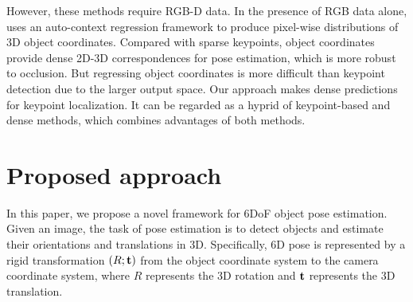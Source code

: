\documentclass[10pt,twocolumn,letterpaper]{article}
\begin{document}
However, these methods require RGB-D data. 
In the presence of RGB data alone, \cite{brachmann2016uncertainty} uses an auto-context regression framework \cite{tu2010auto} to produce pixel-wise distributions of 3D object coordinates. 
Compared with sparse keypoints, object coordinates provide dense 2D-3D correspondences for pose estimation, which is more robust to occlusion. But regressing object coordinates is more difficult than keypoint detection due to the larger output space. Our approach makes dense predictions for keypoint localization. It can be regarded as a hyprid of keypoint-based and dense methods, which combines advantages of both methods.
\section{Proposed approach}%

In this paper, we propose a novel framework for 6DoF object pose estimation. Given an image, the task of pose estimation is to detect objects and estimate their orientations and translations in 3D. Specifically, 6D pose is represented by a rigid transformation $(R; {\bf t})$ from the object coordinate system to the camera coordinate system, where $R$ represents the 3D rotation and $\bf t$ represents the 3D translation.
\end{document}
